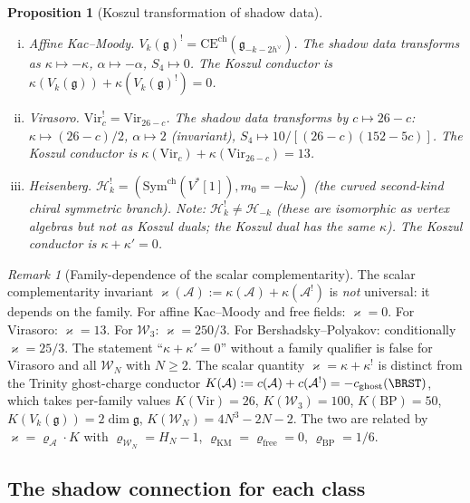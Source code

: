 \documentclass[11pt,reqno]{amsart}
\newtheorem{proposition}[theorem]{Proposition}
\theoremstyle{definition}
\theoremstyle{remark}
\newtheorem{remark}[theorem]{Remark}
\newcommand{\cA}{\mathcal{A}}
\newcommand{\cH}{\mathcal{H}}
\newcommand{\cW}{\mathcal{W}}
\newcommand{\fg}{\mathfrak{g}}
\newcommand{\Vir}{\mathrm{Vir}}
\numberwithin{equation}{section}
\begin{document}
\begin{proposition}[Koszul transformation of shadow
data]\label{prop:koszul-transform}
\leavevmode
\begin{enumerate}[(i)]
\item \emph{Affine Kac--Moody.}\enspace
 $V_k(\fg)^! = \mathrm{CE}^{\mathrm{ch}}
 (\fg_{-k-2h^\vee})$.
 The shadow data transforms as
 $\kappa \mapsto -\kappa$, $\alpha \mapsto -\alpha$,
 $S_4 \mapsto 0$. The Koszul conductor is
 $\kappa(V_k(\fg)) + \kappa(V_k(\fg)^!) = 0$.

\item \emph{Virasoro.}\enspace
 $\Vir_c^! = \Vir_{26-c}$. The shadow data transforms by
 $c \mapsto 26 - c$:
 $\kappa \mapsto (26-c)/2$, $\alpha \mapsto 2$
 (invariant), $S_4 \mapsto 10/[(26-c)(152-5c)]$.
 The Koszul conductor is
 $\kappa(\Vir_c) + \kappa(\Vir_{26-c}) = 13$.

\item \emph{Heisenberg.}\enspace
 $\cH_k^!=(\mathrm{Sym}^{\mathrm{ch}}(V^*[1]),m_0=-k\omega)$
 (the curved second-kind chiral symmetric branch).
 Note: $\cH_k^! \ne \cH_{-k}$ (these are isomorphic as
 vertex algebras but not as Koszul duals; the Koszul dual
 has the same $\kappa$). The Koszul conductor is
 $\kappa + \kappa' = 0$.
\end{enumerate}
\end{proposition}

\begin{remark}[Family-dependence of the scalar complementarity]\label{rem:koszul-conductor}
The scalar complementarity invariant
$\varkappa(\cA) := \kappa(\cA) + \kappa(\cA^!)$
is \emph{not} universal: it depends on the family.
For affine Kac--Moody and free fields: $\varkappa = 0$.
For Virasoro: $\varkappa = 13$.
For $\cW_3$: $\varkappa = 250/3$.
For Bershadsky--Polyakov: conditionally $\varkappa = 25/3$.
The statement ``$\kappa + \kappa' = 0$'' without a family
qualifier is false for Virasoro and all $\cW_N$ with
$N \ge 2$.
The scalar quantity $\varkappa = \kappa + \kappa^!$ is distinct
from the Trinity ghost-charge conductor
$K(\cA) := c(\cA) + c(\cA^!) = -c_{\mathrm{ghost}}(\BRST)$, which
takes per-family values $K(\Vir) = 26$, $K(\cW_3) = 100$,
$K(\mathrm{BP}) = 50$, $K(V_k(\fg)) = 2\dim\fg$,
$K(\cW_N) = 4N^3 - 2N - 2$. The two are related by
$\varkappa = \varrho_{\cA}\cdot K$ with $\varrho_{\cW_N} = H_N - 1$,
$\varrho_{\mathrm{KM}} = \varrho_{\mathrm{free}} = 0$,
$\varrho_{\mathrm{BP}} = 1/6$.
\end{remark}

\subsection{The shadow connection for each
class}\label{subsec:conn-by-class}
\end{document}
